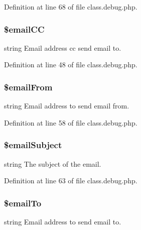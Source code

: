 Definition at line 68 of file class.\-debug.\-php.

\hypertarget{class_debug_aef55490ba633a1821bc784c7c5e5a5e5}{
\subsubsection[{\$email\-C\-C}]{\setlength{\rightskip}{0pt plus 5cm}\$email\-C\-C\hspace{0.3cm}{\ttfamily [static]}}}\label{class_debug_aef55490ba633a1821bc784c7c5e5a5e5}
string Email address cc send email to. 

Definition at line 48 of file class.\-debug.\-php.

\hypertarget{class_debug_a8812e953c70aa15f8f01e0a83230e645}{
\subsubsection[{\$email\-From}]{\setlength{\rightskip}{0pt plus 5cm}\$email\-From\hspace{0.3cm}{\ttfamily [static]}}}\label{class_debug_a8812e953c70aa15f8f01e0a83230e645}
string Email address to send email from. 

Definition at line 58 of file class.\-debug.\-php.

\hypertarget{class_debug_afc4243e1cc62688011c169b622433f64}{
\subsubsection[{\$email\-Subject}]{\setlength{\rightskip}{0pt plus 5cm}\$email\-Subject\hspace{0.3cm}{\ttfamily [static]}}}\label{class_debug_afc4243e1cc62688011c169b622433f64}
string The subject of the email. 

Definition at line 63 of file class.\-debug.\-php.

\hypertarget{class_debug_a2dca3002fa879522effbe7bd729d681d}{
\subsubsection[{\$email\-To}]{\setlength{\rightskip}{0pt plus 5cm}\$email\-To\hspace{0.3cm}{\ttfamily [static]}}}\label{class_debug_a2dca3002fa879522effbe7bd729d681d}
string Email address to send email to. 

